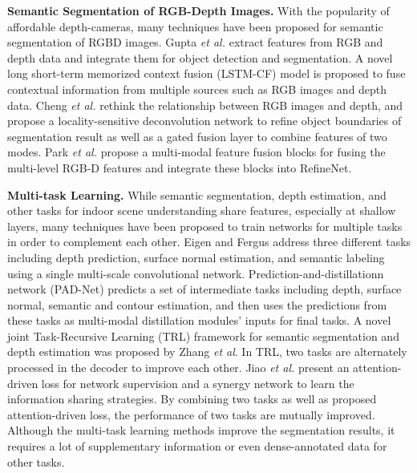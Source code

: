 \noindent \textbf{Semantic Segmentation of RGB-Depth Images.}
%
With the popularity of affordable depth-cameras, many techniques have been proposed for semantic segmentation of RGBD images.
%
Gupta \emph{et al.} \cite{Gupta2014} extract features from RGB and depth data and integrate them for object detection and segmentation.
%
A novel long short-term memorized context fusion (LSTM-CF) model is proposed \cite{Li2016} to fuse contextual information from multiple sources such as RGB images and depth data.
% 
Cheng \emph{et al.} \cite{Cheng2017} rethink the relationship between RGB images and depth, and propose a locality-sensitive deconvolution network to refine object boundaries of segmentation result as well as a gated fusion layer to combine features of two modes.
%
Park \emph{et al.} \cite{Park2017} propose a multi-modal feature fusion blocks for fusing the multi-level RGB-D features and integrate these blocks into RefineNet.


 
\noindent \textbf{Multi-task Learning.} 
%
While semantic segmentation, depth estimation, and other tasks for indoor scene understanding share features, especially at shallow layers, many techniques have been proposed to train networks for multiple tasks in order to complement each other.
%
Eigen and Fergus \cite{Eigen2015} address three different tasks including depth prediction, surface normal estimation, and semantic labeling using a single multi-scale convolutional network. 
%
Prediction-and-distillationn network (PAD-Net)\cite{Xu2018} predicts a set of intermediate tasks including depth, surface normal, semantic and contour estimation, and then uses the predictions from these tasks as multi-modal distillation modules' inputs for final tasks.  
%
A novel joint Task-Recursive Learning (TRL) \cite{Zhang2018} framework for semantic segmentation and depth estimation was proposed by Zhang \emph{et al}. 
%
In TRL, two tasks are alternately processed in the decoder to improve each other.
% 
Jiao \emph{et al.} \cite{Jiao2018} present an attention-driven loss for network supervision and a synergy network to learn the information sharing strategies. 
%
By combining two tasks as well as proposed attention-driven loss, the performance of two tasks are mutually improved.
%
Although the multi-task learning methods improve the segmentation results, it requires a lot of supplementary information or even dense-annotated data for other tasks.

